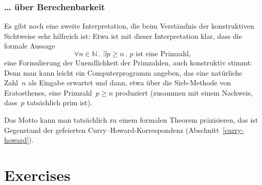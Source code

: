 \documentclass[10pt,reqno,a4paper,openany]{amsbook}
\theoremstyle{definition}
\theoremstyle{plain}
\theoremstyle{remark}
\newcommand{\NN}{\mathbb{N}}
\newcommand{\?}{\,{:}\,}
\renewcommand{\_}{\mathpunct{.}\,}
\begin{document}
\subsubsection*{\ldots{} über Berechenbarkeit}

Es gibt noch eine zweite Interpretation, die beim Verständnis der konstruktiven
Sichtweise sehr hilfreich ist:
Etwa ist mit dieser Interpretation klar, dass die formale Aussage
\[ \forall n \in \NN\_ \exists p \geq n\_ \text{$p$ ist eine Primzahl}, \]
eine Formulierung der Unendlichkeit der Primzahlen, auch konstruktiv
stimmt: Denn man kann leicht ein Computerprogramm angeben, das eine natürliche
Zahl~$n$ als Eingabe erwartet und dann, etwa über die Sieb-Methode von
Eratosthenes, eine Primzahl~$p \geq n$ produziert (zusammen mit einem Nachweis,
dass~$p$ tatsächlich prim ist).

Das Motto kann man tatsächlich zu einem formalen Theorem
präzisieren, das ist Gegenstand der gefeierten
Curry--Howard-Korrespondenz (Abschnitt~\ref{curry-howard}).



\section{Exercises}
\end{document}
